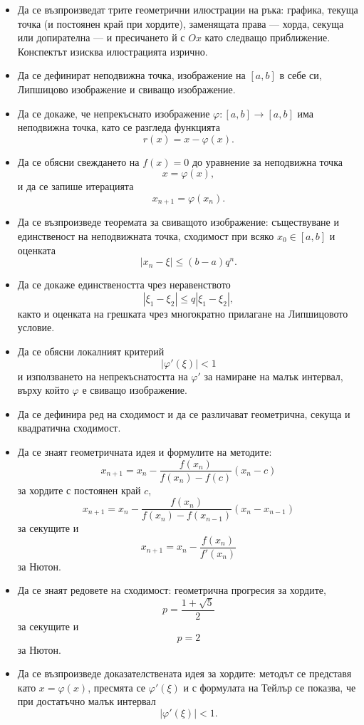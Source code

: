 \begin{itemize}
\item Да се възпроизведат трите геометрични илюстрации на ръка: графика, текуща точка (и постоянен край при хордите), заменящата права --- хорда, секуща или допирателна --- и пресичането й с $Ox$ като следващо приближение. Конспектът изисква илюстрацията изрично.
\item Да се дефинират неподвижна точка, изображение на $[a,b]$ в себе си, Липшицово изображение и свиващо изображение.

\item Да се докаже, че непрекъснато изображение $\varphi:[a,b]\to[a,b]$ има неподвижна точка, като се разгледа функцията
\[
r(x)=x-\varphi(x).
\]

\item Да се обясни свеждането на $f(x)=0$ до уравнение за неподвижна точка
\[
x=\varphi(x),
\]
и да се запише итерацията
\[
x_{n+1}=\varphi(x_n).
\]

\item Да се възпроизведе теоремата за свиващото изображение: съществуване и единственост на неподвижната точка, сходимост при всяко $x_0\in[a,b]$ и оценката
\[
|x_n-\xi|\leq(b-a)q^n.
\]

\item Да се докаже единствеността чрез неравенството
\[
|\xi_1-\xi_2|\leq q|\xi_1-\xi_2|,
\]
както и оценката на грешката чрез многократно прилагане на Липшицовото условие.

\item Да се обясни локалният критерий
\[
|\varphi'(\xi)|<1
\]
и използването на непрекъснатостта на $\varphi'$ за намиране на малък интервал, върху който $\varphi$ е свиващо изображение.

\item Да се дефинира ред на сходимост и да се различават геометрична, секуща и квадратична сходимост.

\item Да се знаят геометричната идея и формулите на методите:
\[
x_{n+1}
=
x_n-
\frac{f(x_n)}{f(x_n)-f(c)}(x_n-c)
\]
за хордите с постоянен край $c$,
\[
x_{n+1}
=
x_n-
\frac{f(x_n)}{f(x_n)-f(x_{n-1})}(x_n-x_{n-1})
\]
за секущите и
\[
x_{n+1}=x_n-\frac{f(x_n)}{f'(x_n)}
\]
за Нютон.

\item Да се знаят редовете на сходимост: геометрична прогресия за хордите,
\[
p=\frac{1+\sqrt5}{2}
\]
за секущите и
\[
p=2
\]
за Нютон.

\item Да се възпроизведе доказателствената идея за хордите: методът се представя като $x=\varphi(x)$, пресмята се $\varphi'(\xi)$ и с формулата на Тейлър се показва, че при достатъчно малък интервал
\[
|\varphi'(\xi)|<1.
\]
\end{itemize}
